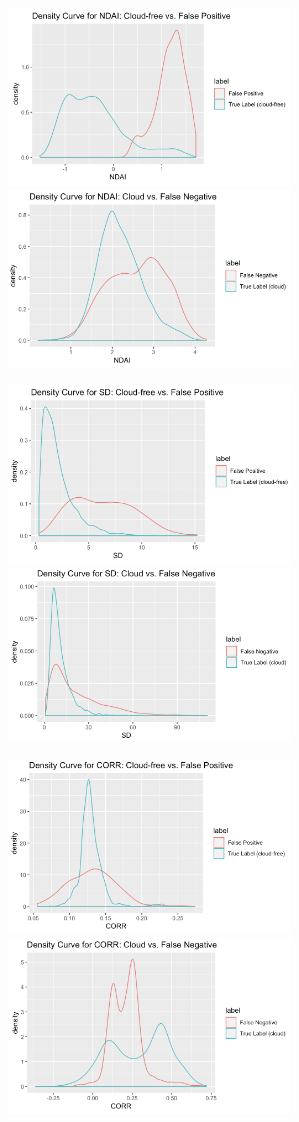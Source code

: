 \documentclass[11pt]{article}
\begin{document}
\includegraphics[width = 7.5cm]{4(d)ndai1}
\includegraphics[width = 7.5cm]{4(d)ndai2}

\includegraphics[width = 7.5cm]{4(d)sd1}
\includegraphics[width = 7.5cm]{4(d)sd2}

\includegraphics[width = 7.5cm]{4(d)corr1}
\includegraphics[width = 7.5cm]{4(d)corr2}
\end{document}
